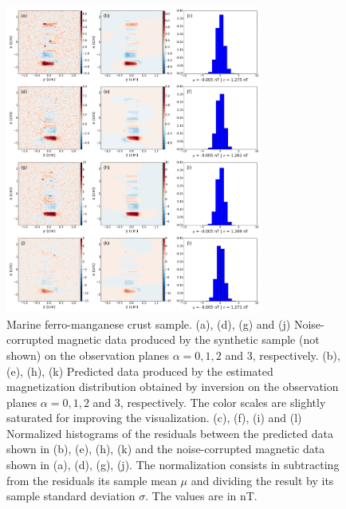 \documentclass[galley,gc]{agutex}
\begin{document}
 \begin{figure}
 \noindent \includegraphics[width=20pc]{Figs/Fig11_LQ.png}
 \caption{Marine ferro-manganese crust sample. (a), (d), (g) and (j) Noise-corrupted
 magnetic data produced by the synthetic sample (not shown) on the
 observation planes $\alpha = 0, 1, 2$ and $3$, respectively.
 (b), (e), (h), (k) Predicted data produced by the estimated
 magnetization distribution obtained by inversion on the
 observation planes $\alpha = 0, 1, 2$ and $3$, respectively.
 The color scales are slightly saturated for improving the visualization.
 (c), (f), (i) and (l) Normalized histograms of the residuals between the
 predicted data shown in (b), (e), (h), (k) and the 
 noise-corrupted magnetic data shown in (a), (d), (g), (j). 
 The normalization
 consists in subtracting from the residuals its sample mean $\mu$ 
 and dividing the result by its sample standard deviation $\sigma$.
 The values are in nT.}
 \label{fig:datafit-oda}
 \end{figure}
 
\end{document}
